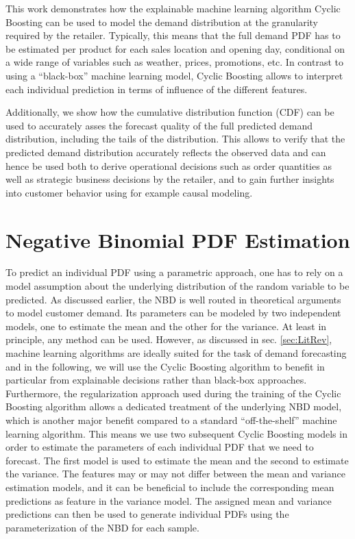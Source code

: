 \documentclass[BCOR=1mm, DIV=calc,10pt,
twoside=true,
twocolumn,
headings=normal]{scrartcl}
\begin{document}
This work demonstrates how the explainable machine learning algorithm Cyclic Boosting \cite{Wick2019} can be used to model the demand distribution at the granularity required by the retailer. Typically, this means that the full demand PDF has to be estimated per product for each sales location and opening day, conditional on a wide range of variables such as weather, prices, promotions, etc. In contrast to using a ``black-box'' machine learning model, Cyclic Boosting allows to interpret each individual prediction in terms of influence of the different features.

Additionally, we show how the cumulative distribution function (CDF) can be used to accurately asses the forecast quality of the full predicted demand distribution, including the tails of the distribution. This allows to verify that the predicted demand distribution accurately reflects the observed data and can hence be used both to derive operational decisions such as order quantities as well as strategic business decisions by the retailer, and to gain further insights into customer behavior using for example causal modeling.


\section{Negative Binomial PDF Estimation}
\label{sec:pdfEstimation}

To predict an individual PDF using a parametric approach, one has to rely on a model assumption about the underlying distribution of the random variable to be predicted. As discussed earlier, the NBD is well routed in theoretical arguments to model customer demand. Its parameters can be modeled by two independent models, one to estimate the mean and the other for the variance. At least in principle, any method can be used. However, as discussed in sec. \ref{sec:LitRev}, machine learning algorithms are ideally suited for the task of demand forecasting and in the following, we will use the Cyclic Boosting algorithm to benefit in particular from explainable decisions rather than black-box approaches. Furthermore, the regularization approach used during the training of the Cyclic Boosting algorithm allows a dedicated treatment of the underlying NBD model, which is another major benefit compared to a standard ``off-the-shelf'' machine learning algorithm. This means we use two subsequent Cyclic Boosting models in order to estimate the parameters of each individual PDF that we need to forecast. The first model is used to estimate the mean and the second to estimate the variance. The features may or may not differ between the mean and variance estimation models, and it can be beneficial to include the corresponding mean predictions as feature in the variance model. The assigned mean and variance predictions can then be used to generate individual PDFs using the parameterization of the NBD for each sample.
\end{document}
